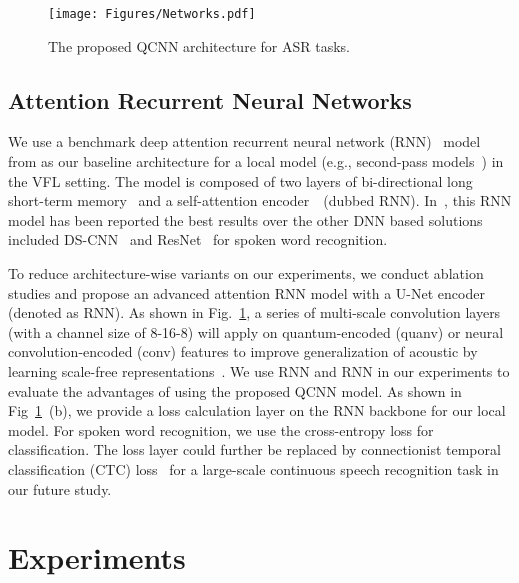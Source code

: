 \documentclass{article}
\begin{document}
\begin{figure}[h]
\begin{center}
  \centering    
\texttt{[image: Figures/Networks.pdf]}
\end{center}
\vspace{-0.4cm}
  \caption{The proposed QCNN architecture for ASR tasks.
  } 
\label{fig:3:network}
\vspace{-0.6cm}
\end{figure}

\subsection{Attention Recurrent Neural Networks}
We use a benchmark deep attention recurrent neural network (RNN)~\cite{hochreiter1997long} model from \cite{de2018neural} as our baseline architecture for a local model (e.g., second-pass models~\cite{chen2019federated,yang2020multi}) in the VFL setting. The model is composed of two layers of bi-directional long short-term memory~\cite{hochreiter1997long} and a self-attention encoder~\cite{vaswani2017attention}~(dubbed RNN). In~\cite{de2018neural}, this RNN model has been reported the best results over the other DNN based solutions included DS-CNN~\cite{zhang2017hello} and ResNet~\cite{warden2018speech} for spoken word recognition.

To reduce architecture-wise variants on our experiments, we conduct ablation studies and propose an advanced attention RNN model with a U-Net encoder~\cite{yang2020characterizing} (denoted as RNN). As shown in Fig.~\ref{fig:3:network}, a series of multi-scale convolution layers (with a channel size of 8-16-8) will apply on quantum-encoded (quanv) or neural convolution-encoded (conv) features to improve generalization of acoustic by learning scale-free representations~\cite{yang2020characterizing}. We use RNN and RNN in our experiments to evaluate the advantages of using the proposed QCNN model. As shown in Fig~\ref{fig:3:network}~(b), we provide a loss calculation layer on the RNN backbone for our local model. For spoken word recognition, we use the cross-entropy loss for classification. The loss layer could further be replaced by connectionist temporal classification (CTC) loss~\cite{graves2006connectionist} for a large-scale continuous speech recognition task in our future study.


\section{Experiments}
\label{sec:exp}
\end{document}
